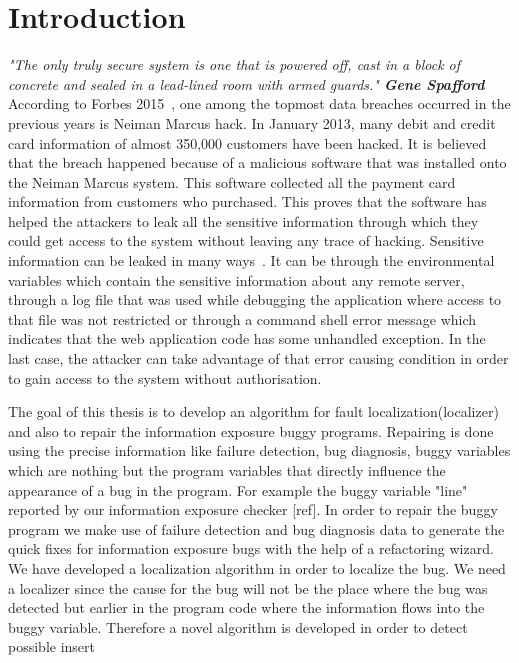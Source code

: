 
\chapter{Introduction}
\label{chapter:Introduction}


\textit{"The only truly secure system is one that is powered off, cast in a block of concrete 
and sealed in a lead-lined room with armed guards."
\textemdash  \textbf{ Gene Spafford}} \\

According to Forbes 2015~\cite{forbes:bill}, one among the topmost data breaches occurred in the 
previous years is Neiman Marcus hack.
In January 2013, many debit and credit card information of almost 350,000 customers have been
hacked. It is believed that the breach happened because of a malicious software
that was installed onto the Neiman Marcus system. This software collected all the payment
card information from customers who purchased.
This proves that the software has helped the attackers to leak all the sensitive information
through which they could get access to the system without leaving any trace of hacking.
Sensitive information can be leaked in many ways~\cite{mitre:CWE}. It can be through the environmental variables 
which contain the sensitive information about any remote server, through a log file that was
used while debugging the application where access to that file was not restricted or through a
command shell error message which indicates that the web application code has some unhandled exception.
In the last case, the attacker can take advantage of that error causing
condition in order to gain access to the system without authorisation.


The goal of this thesis is to develop an algorithm for fault localization(localizer) and also to repair the 
information exposure buggy programs. Repairing is done using the precise information like failure detection,
bug diagnosis, buggy variables which are nothing but the program variables that directly influence
the appearance of a bug in the program.
For example the buggy variable "line" reported by our information exposure checker [ref]. In order to 
repair the buggy program we make use of failure detection and bug diagnosis data to generate the quick fixes
for information exposure bugs with the help of a refactoring wizard. We have developed a localization algorithm 
in order to localize the bug. We need a localizer since the cause for the bug will not be the place where
the bug was detected but earlier in the program code where the information flows into the buggy variable.
Therefore a novel algorithm is developed in order to detect possible insert




